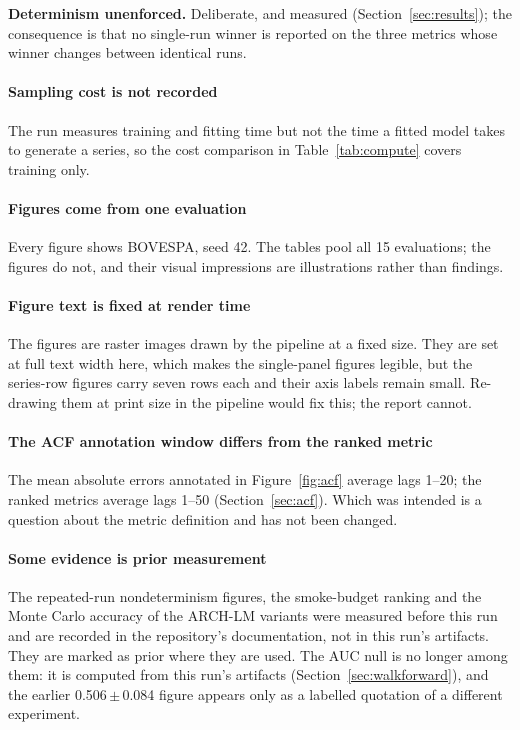 \documentclass[11pt,a4paper]{article}
\makeatletter
\DeclareRobustCommand{\_}{\ifmmode\nfss@text{\textunderscore}\else\textunderscore\allowbreak\fi}
\makeatother
\begin{document}
\textbf{Determinism unenforced.} Deliberate, and measured (Section~\ref{sec:results}); the consequence is that no single-run winner is reported on the three metrics whose winner changes between identical runs.

\paragraph{Sampling cost is not recorded} The run measures training and fitting time but not the time a fitted model takes to generate a series, so the cost comparison in Table~\ref{tab:compute} covers training only.

\paragraph{Figures come from one evaluation} Every figure shows BOVESPA, seed 42. The tables pool all 15 evaluations; the figures do not, and their visual impressions are illustrations rather than findings.

\paragraph{Figure text is fixed at render time} The figures are raster images drawn by the pipeline at a fixed size. They are set at full text width here, which makes the single-panel figures legible, but the series-row figures carry seven rows each and their axis labels remain small. Re-drawing them at print size in the pipeline would fix this; the report cannot.

\paragraph{The ACF annotation window differs from the ranked metric} The mean absolute errors annotated in Figure~\ref{fig:acf} average lags 1--20; the ranked metrics average lags 1--50 (Section~\ref{sec:acf}). Which was intended is a question about the metric definition and has not been changed.

\paragraph{Some evidence is prior measurement} The repeated-run nondeterminism figures, the smoke-budget ranking and the Monte Carlo accuracy of the ARCH-LM variants were measured before this run and are recorded in the repository's documentation, not in this run's artifacts. They are marked as prior where they are used. The AUC null is no longer among them: it is computed from this run's artifacts (Section~\ref{sec:walkforward}), and the earlier 0.506\,$\pm$\,0.084 figure appears only as a labelled quotation of a different experiment.
\end{document}
